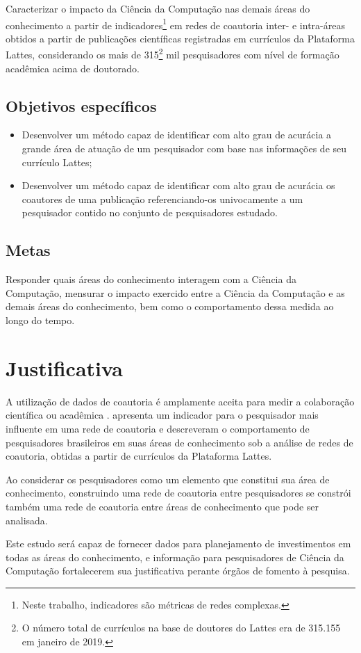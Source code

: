 Caracterizar o impacto da Ciência da Computação nas demais áreas do conhecimento a partir de indicadores\footnote{Neste trabalho, indicadores são métricas de redes complexas.} em redes de coautoria inter- e intra-áreas obtidos a partir de publicações científicas registradas em currículos da Plataforma Lattes, considerando os mais de 315\footnote{O número total de currículos na base de doutores do Lattes era de 315.155 em janeiro de 2019.} mil pesquisadores com nível de formação acadêmica acima de doutorado.

\subsection{Objetivos específicos}

\begin{itemize}
\item Desenvolver um método capaz de identificar com alto grau de acurácia a grande área de atuação de um pesquisador com base nas informações de seu currículo Lattes;
\item Desenvolver um método capaz de identificar com alto grau de acurácia os coautores de uma publicação referenciando-os univocamente a um pesquisador contido no conjunto de pesquisadores estudado.
\end{itemize}

\subsection{Metas}

Responder quais áreas do conhecimento interagem com a Ciência da Computação, mensurar o impacto exercido entre a Ciência da Computação e as demais áreas do conhecimento, bem como o comportamento dessa medida ao longo do tempo.

\section{Justificativa}

A utilização de dados de coautoria é amplamente aceita para medir a colaboração científica ou acadêmica \cite{katz1997research}.  apresenta um indicador para o pesquisador mais influente em uma rede de coautoria e  descreveram o comportamento de pesquisadores brasileiros em suas áreas de conhecimento sob a análise de redes de coautoria, obtidas a partir de currículos da Plataforma Lattes.

Ao considerar os pesquisadores como um elemento que constitui sua área de conhecimento, construindo uma rede de coautoria entre pesquisadores se constrói também uma rede de coautoria entre áreas de conhecimento que pode ser analisada.

Este estudo será capaz de fornecer dados para planejamento de investimentos em todas as áreas do conhecimento, e informação para pesquisadores de Ciência da Computação fortalecerem sua justificativa perante órgãos de fomento à pesquisa.
